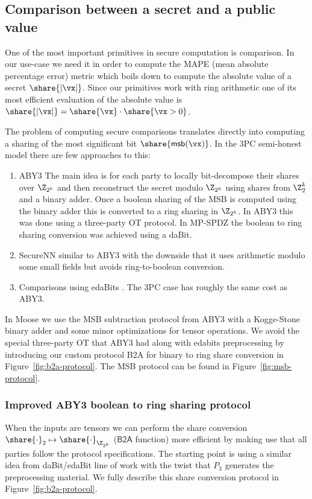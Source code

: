 \subsection{Comparison between a secret and a public value}
One of the most important primitives in secure computation is comparison.
In our use-case we need it in order to compute the MAPE (mean absolute percentage error) metric which boils down to compute
the absolute value of a secret $\share{|\vx|}$. Since our primitives work with ring arithmetic
one of its most efficient evaluation of the absolute value is $\share{|\vx|} = \share{\vx} \cdot \share{\vx > 0}$.

The problem of computing secure comparisons translates directly into computing a sharing of the most significant bit $\share{\mathsf{msb}(\vx)}$.
In the 3PC semi-honest model there are few approaches to this:
\begin{enumerate}
   \item ABY3 \cite{CCS:MohRin18} The main idea is for
   each party to locally bit-decompose their shares over $\Z_{2^k}$ and then
   reconstruct the secret modulo $\Z_{2^k}$ using shares from $\Z^k_2$ and a
   binary adder. Once a boolean sharing of the MSB is computed using the binary adder
   this is converted to a ring sharing in $\Z_{2^k}$.
   In ABY3 this was done using a three-party OT protocol. In MP-SPDZ \cite{CCS:Keller20} 
   the boolean to ring sharing conversion was achieved using a daBit.
   \item SecureNN \cite{PoPETS:WagGupCha19} 
   similar to ABY3 with the downside that it uses arithmetic modulo
   some small fields but avoids ring-to-boolean conversion.
  \item Comparisons using edaBits \cite{C:EGKRS20}. The 3PC case has roughly the same cost as ABY3.
\end{enumerate}

In Moose we use the MSB subtraction protocol from ABY3 with a Kogge-Stone binary adder and
some minor optimizations for tensor operations. 
We avoid the special three-party OT that ABY3 had along with edabits preprocessing by introducing
our custom protocol \textsf{B2A} for binary to ring share conversion in Figure~\ref{fig:b2a-protocol}.
The MSB protocol can be found in Figure~\ref{fig:msb-protocol}.


\subsubsection{Improved ABY3 boolean to ring sharing protocol}
When the inputs are tensors we can perform the share conversion $\share{\cdot}_2
\mapsto \share{\cdot}_{\Z_{2^k}}$ ($\mathsf{B2A}$ function)
more efficient by making use that all parties
follow the protocol specifications. The starting point is using a similar idea
from daBit/edaBit \cite{INDOCRYPT:RotWoo19,C:EGKRS20}
line of work with the twist that $P_3$ generates the preprocessing
material. We fully describe this share conversion protocol in Figure~\ref{fig:b2a-protocol}.

